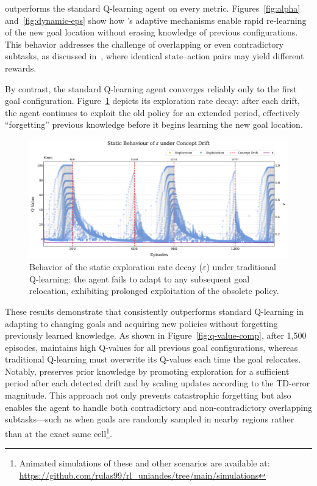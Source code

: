 \begin{table}
    \centering
    \caption{Performance summary over 1,000 runs: average $\pm$ standard deviation of steps to reach the goal after each drift, and total steps for all 1,500 episodes.}
    
    \label{tab:multi}
\end{table}

\adaptiverl outperforms the standard Q-learning agent on every metric. Figures~\ref{fig:alpha} and~\ref{fig:dynamic-eps} show how \adaptiverl’s adaptive mechanisms enable rapid re-learning of the new goal location without erasing knowledge of previous configurations. This behavior addresses the challenge of overlapping or even contradictory subtasks, as discussed in~\cite{Bagus2022}, where identical state–action pairs may yield different rewards.

By contrast, the standard Q-learning agent converges reliably only to the first goal configuration. Figure~\ref{fig:static-eps} depicts its exploration rate decay: after each drift, the agent continues to exploit the old policy for an extended period, effectively “forgetting” previous knowledge before it begins learning the new goal location.

\begin{figure}
    \centering
    \includegraphics[width=\textwidth]{figures/trad_eps.png}
    \caption{Behavior of the static exploration rate decay ($\varepsilon$) under traditional Q-learning: the agent fails to adapt to any subsequent goal relocation, exhibiting prolonged exploitation of the obsolete policy.}
    \label{fig:static-eps}
\end{figure}


These results demonstrate that \adaptiverl consistently outperforms standard Q-learning in adapting to changing goals and acquiring new policies without forgetting previously learned knowledge. As shown in Figure~\ref{fig:q-value-comp}, after 1,500 episodes, \adaptiverl maintains high Q-values for all previous goal configurations, whereas traditional Q-learning must overwrite its Q-values each time the goal relocates. Notably, \adaptiverl preserves prior knowledge by promoting exploration for a sufficient period after each detected drift and by scaling updates according to the TD-error magnitude. This approach not only prevents catastrophic forgetting but also enables the agent to handle both contradictory and non-contradictory overlapping subtasks—such as when goals are randomly sampled in nearby regions rather than at the exact same cell\footnote{Animated simulations of these and other scenarios are available at: \url{https://github.com/rulas99/rl_uniandes/tree/main/simulations}}.

